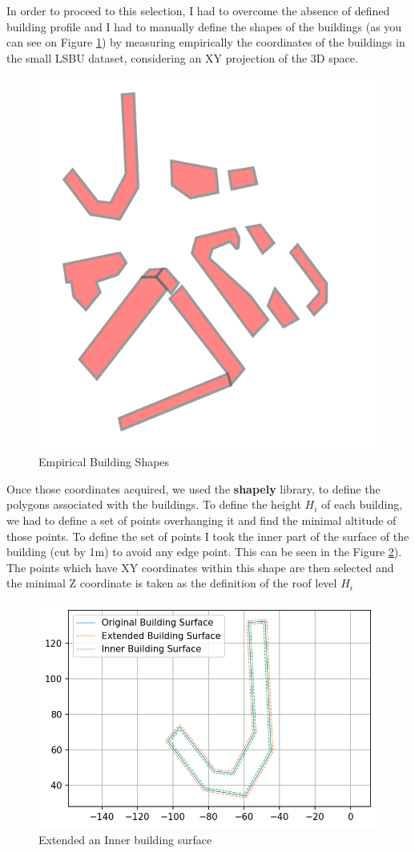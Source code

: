 In order to proceed to this selection, I had to overcome the absence of defined building profile and I had to manually define the shapes of the buildings (as you can see on Figure \ref{fig:buildingshapes}) by measuring empirically the coordinates of the buildings in the small LSBU dataset, considering an XY projection of the 3D space. \\

\begin{figure}[h]
\centering
    \includegraphics[width = 0.25 \textwidth]{figures/Subset/buildingShapes_13}
    \caption{Empirical Building Shapes}
    \label{fig:buildingshapes}
\end{figure}

Once those coordinates acquired, we used the \textbf{shapely} library, to define the polygons associated with the buildings. To define the height $H_i$ of each building, we had to define a set of points overhanging it and find the minimal altitude of those points.  To define the set of points I took the inner part of the surface of the building (cut by 1m) to avoid any edge point. This can be seen in the Figure \ref{fig:inner_outer_building}). The points which have XY coordinates within this shape are then selected and the minimal Z coordinate is taken as the definition of the roof level $H_i$ \\


\begin{figure}[h]
\centering
    \includegraphics[width = 0.7 \textwidth]{figures/Subset/BuildingSurfaceBuffer}
    \caption{Extended an Inner building surface}
    \label{fig:inner_outer_building}
\end{figure}

